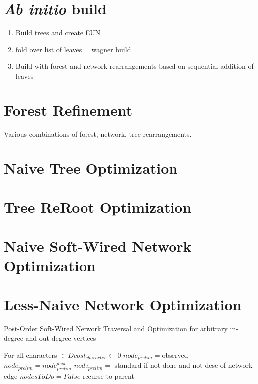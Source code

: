 \documentclass[11pt]{article}
\begin{document}
 \section{\textit{Ab initio} build}
 	\begin{enumerate}
		\item{Build trees and create EUN}
		\item{fold over list of leaves = wagner build}
		\item{Build with forest and network rearrangements based on sequential addition of leaves}
	\end{enumerate}
	
\section{Forest Refinement}
Various combinations of forest, network, tree rearrangements.

 \section{Naive Tree Optimization}
 
 \section{Tree ReRoot Optimization}
 
 \section{Naive Soft-Wired Network Optimization}
 
 \section{Less-Naive Network Optimization}
 

	\begin{algorithm}
		\caption{Post-Order Soft-Wired Network Traversal and Optimization for arbitrary in-degree 
		and out-degree vertices}
		\label{alg:PON}
		\SetAlgoLined
		For all characters $\in D cost_{character} \gets 0$\;
		 {
			 {$node_{prelim} = $observed} 
			 {$node_{prelim} = node^{desc}_{prelim}$} 
			 {$node_{prelim} = $ standard if not done and not desc of network edge} 
			 {$nodesToDo = False$}
			 {recurse to parent}
		} 
	\end{algorithm}
	
\end{document}
